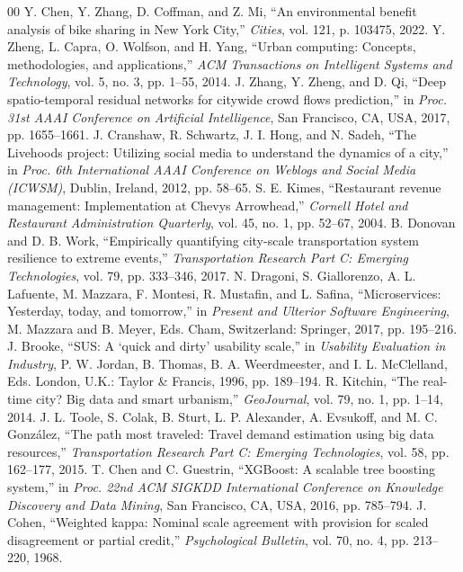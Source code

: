 \documentclass[conference]{IEEEtran}
\begin{document}
\begin{thebibliography}{00}
 Y. Chen, Y. Zhang, D. Coffman, and Z. Mi, ``An environmental benefit analysis of bike sharing in New York City,'' \textit{Cities}, vol. 121, p. 103475, 2022.
 Y. Zheng, L. Capra, O. Wolfson, and H. Yang, ``Urban computing: Concepts, methodologies, and applications,'' \textit{ACM Transactions on Intelligent Systems and Technology}, vol. 5, no. 3, pp. 1--55, 2014.
 J. Zhang, Y. Zheng, and D. Qi, ``Deep spatio-temporal residual networks for citywide crowd flows prediction,'' in \textit{Proc. 31st AAAI Conference on Artificial Intelligence}, San Francisco, CA, USA, 2017, pp. 1655--1661.
 J. Cranshaw, R. Schwartz, J. I. Hong, and N. Sadeh, ``The Livehoods project: Utilizing social media to understand the dynamics of a city,'' in \textit{Proc. 6th International AAAI Conference on Weblogs and Social Media (ICWSM)}, Dublin, Ireland, 2012, pp. 58--65.
 S. E. Kimes, ``Restaurant revenue management: Implementation at Chevys Arrowhead,'' \textit{Cornell Hotel and Restaurant Administration Quarterly}, vol. 45, no. 1, pp. 52--67, 2004.
 B. Donovan and D. B. Work, ``Empirically quantifying city-scale transportation system resilience to extreme events,'' \textit{Transportation Research Part C: Emerging Technologies}, vol. 79, pp. 333--346, 2017.
 N. Dragoni, S. Giallorenzo, A. L. Lafuente, M. Mazzara, F. Montesi, R. Mustafin, and L. Safina, ``Microservices: Yesterday, today, and tomorrow,'' in \textit{Present and Ulterior Software Engineering}, M. Mazzara and B. Meyer, Eds. Cham, Switzerland: Springer, 2017, pp. 195--216.
 J. Brooke, ``SUS: A `quick and dirty' usability scale,'' in \textit{Usability Evaluation in Industry}, P. W. Jordan, B. Thomas, B. A. Weerdmeester, and I. L. McClelland, Eds. London, U.K.: Taylor \& Francis, 1996, pp. 189--194.
 R. Kitchin, ``The real-time city? Big data and smart urbanism,'' \textit{GeoJournal}, vol. 79, no. 1, pp. 1--14, 2014.
 J. L. Toole, S. Colak, B. Sturt, L. P. Alexander, A. Evsukoff, and M. C. Gonz\'{a}lez, ``The path most traveled: Travel demand estimation using big data resources,'' \textit{Transportation Research Part C: Emerging Technologies}, vol. 58, pp. 162--177, 2015.
 T. Chen and C. Guestrin, ``XGBoost: A scalable tree boosting system,'' in \textit{Proc. 22nd ACM SIGKDD International Conference on Knowledge Discovery and Data Mining}, San Francisco, CA, USA, 2016, pp. 785--794.
 J. Cohen, ``Weighted kappa: Nominal scale agreement with provision for scaled disagreement or partial credit,'' \textit{Psychological Bulletin}, vol. 70, no. 4, pp. 213--220, 1968.
\end{thebibliography}
\end{document}
